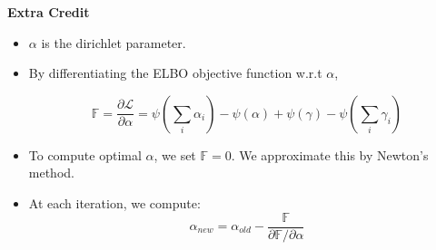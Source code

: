 \documentclass[a4paper]{article}
\begin{document}
\begin{tcolorbox}
\begin{center}
\textbf{Extra Credit}
\end{center}
\end{tcolorbox}
\begin{itemize}
	\item $\alpha$ is the dirichlet parameter.
	\item By differentiating the ELBO objective function w.r.t $\alpha$,

	\[\mathbb{F} = \dfrac{\partial \mathcal{L}}{\partial \alpha} = \psi(\sum_i \alpha_i) - \psi(\alpha) + \psi(\gamma) - \psi(\sum_i \gamma_i) \]

	\item To compute optimal $\alpha$, we set $\mathbb{F} = 0$. We approximate this by Newton's method.
	\item At each iteration, we compute:
	\[\alpha_{new} = \alpha_{old} - \dfrac{\mathbb{F}}{\partial \mathbb{F}/ \partial \alpha}\]

	
\end{itemize}
\end{document}
